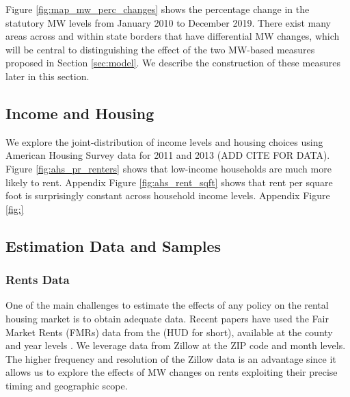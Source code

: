 Figure \ref{fig:map_mw_perc_changes} shows the percentage change 
in the statutory MW levels from January 2010 to December 2019.
There exist many areas across and within state borders that have differential 
MW changes, which will be central to distinguishing the effect of the two 
MW-based measures proposed in Section \ref{sec:model}.
We describe the construction of these measures later in this section.


\subsection{Income and Housing}

We explore the joint-distribution of income levels and housing choices using 
American Housing Survey data for 2011 and 2013 (ADD CITE FOR DATA).
Figure \ref{fig:ahs_pr_renters} shows that low-income households are much
more likely to rent.
Appendix Figure \ref{fig:ahs_rent_sqft} shows that rent per square foot is 
surprisingly constant across household income levels.
Appendix Figure \ref{fig:}


\subsection{Estimation Data and Samples}


\subsubsection{Rents Data}

One of the main challenges to estimate the effects of any policy on the rental
housing market is to obtain adequate data.
Recent papers have used the Fair Market Rents (FMRs) data from the 
\citeauthor{hudSAFMR} (HUD for short), available at the county and year levels 
\parencite{Tidemann2018, Yamagishi2019}.
We leverage data from Zillow at the ZIP code and month levels.
The higher frequency and resolution of the Zillow data is an advantage since it 
allows us to explore the effects of MW changes on rents exploiting their precise
timing and geographic scope. 

